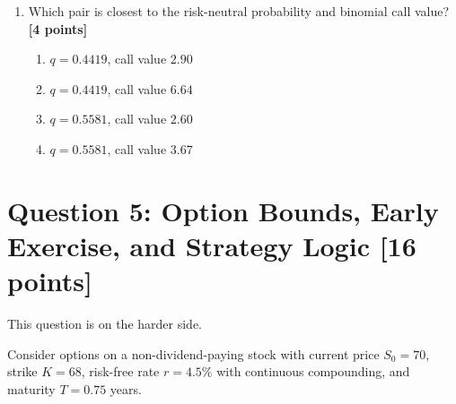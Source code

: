 \documentclass[11pt]{article}
\newcommand{\pts}[1]{\hspace{0.35em}\textnormal{\textbf{[#1 points]}}}
\newenvironment{choices}{\begin{enumerate}[label=\Alph*.,leftmargin=2.2em,itemsep=0.12em,topsep=0.12em]}{\end{enumerate}}
\begin{document}
\begin{enumerate}
    \item Which pair is closest to the risk-neutral probability and binomial call
    value? \pts{4}
    \begin{choices}
        \item $q=0.4419$, call value $2.90$
        \item $q=0.4419$, call value $6.64$
        \item $q=0.5581$, call value $2.60$
        \item $q=0.5581$, call value $3.67$
    \end{choices}
\end{enumerate}

\section*{Question 5: Option Bounds, Early Exercise, and Strategy Logic \pts{16}}

This question is on the harder side.

Consider options on a non-dividend-paying stock with current price $S_0=70$,
strike $K=68$, risk-free rate $r=4.5\%$ with continuous compounding, and maturity
$T=0.75$ years.
\end{document}
